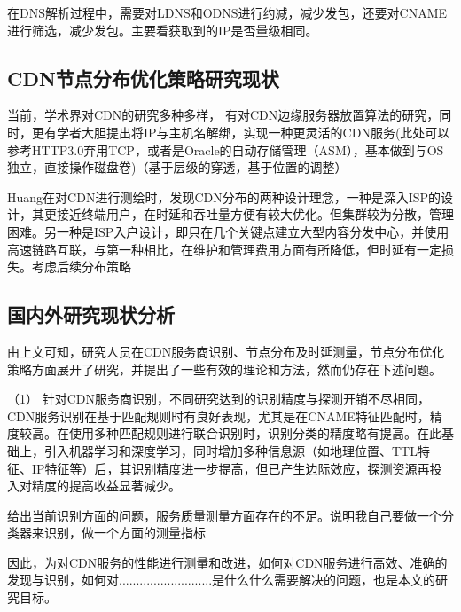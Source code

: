 在DNS解析过程中，需要对LDNS和ODNS进行约减，减少发包，还要对CNAME进行筛选，减少发包。主要看获取到的IP是否量级相同。




\subsection{CDN节点分布优化策略研究现状}
当前，学术界对CDN的研究多种多样，
有对CDN边缘服务器放置算法的研究\cite{Sahoo2016}，同时，更有学者大胆提出将IP与主机名解绑\cite{Fayed-IpUnbind-2021}，实现一种更灵活的CDN服务(此处可以参考HTTP3.0弃用TCP，或者是Oracle的自动存储管理（ASM），基本做到与OS独立，直接操作磁盘卷)（基于层级的穿透，基于位置的调整）


Huang\cite{Huang2008}在对CDN进行测绘时，发现CDN分布的两种设计理念，一种是深入ISP的设计，其更接近终端用户，在时延和吞吐量方便有较大优化。但集群较为分散，管理困难。另一种是ISP入户设计，即只在几个关键点建立大型内容分发中心，并使用高速链路互联，与第一种相比，在维护和管理费用方面有所降低，但时延有一定损失。考虑后续分布策略

\subsection{国内外研究现状分析}
由上文可知，研究人员在CDN服务商识别、节点分布及时延测量，节点分布优化策略方面展开了研究，并提出了一些有效的理论和方法，然而仍存在下述问题。

（1） 针对CDN服务商识别，不同研究达到的识别精度与探测开销不尽相同，CDN服务识别在基于匹配规则时有良好表现，尤其是在CNAME特征匹配时，精度较高。在使用多种匹配规则进行联合识别时，识别分类的精度略有提高。在此基础上，引入机器学习和深度学习，同时增加多种信息源（如地理位置、TTL特征、IP特征等）后，其识别精度进一步提高，但已产生边际效应，探测资源再投入对精度的提高收益显著减少。



给出当前识别方面的问题，服务质量测量方面存在的不足。说明我自己要做一个分类器来识别，做一个方面的测量指标


因此，为对CDN服务的性能进行测量和改进，如何对CDN服务进行高效、准确的发现与识别，如何对...........................是什么什么需要解决的问题，也是本文的研究目标。







